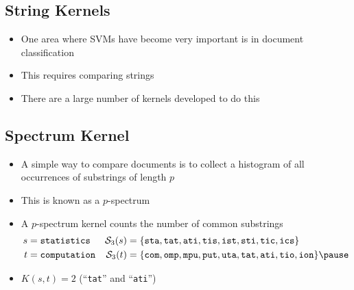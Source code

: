 
\begin{slide}
\section{String Kernels}

\begin{PauseHighLight}
  \begin{itemize}
  \item One area where SVMs have become very important is in document
    classification\pause
  \item This requires comparing strings\pause
  \item There are a large number of kernels developed to do this\pause
  \end{itemize}
\end{PauseHighLight}

\end{slide}


\begin{slide}
\section[-1]{Spectrum Kernel}

\begin{PauseHighLight}
  \begin{itemize}
  \item A simple way to compare documents is to collect a histogram of
    all occurrences of substrings of length $p$\pause
  \item This is known as a $p$-spectrum\pause
  \item A $p$-spectrum kernel counts the number of common substrings
    {\small
    \begin{align*}
      s &= \mbox{\tt statistics} & \mathcal{S}_3(s) &= \{\mathtt{sta, tat, ati, tis,
      ist, sti, tic, ics}\}
      \\
      t &= \mbox{\tt computation} & \mathcal{S}_3(t) &= \{\mathtt{com, omp,
      mpu, put, uta, tat, ati, tio, ion}\}\pause
    \end{align*}}
  \item $K(s,t) = 2$ (``\texttt{tat}'' and ``\texttt{ati}'')\pause
  \end{itemize}
\end{PauseHighLight}

\end{slide}

